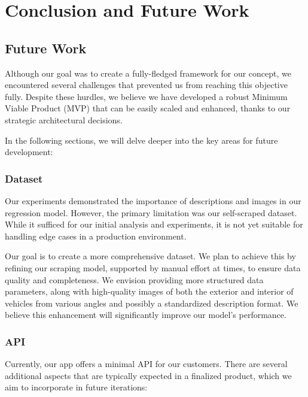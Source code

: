 \chapter{Conclusion and Future Work}

\section{Future Work}

Although our goal was to create a fully-fledged framework for our concept, we encountered several challenges that prevented us from reaching this objective fully. Despite these hurdles, we believe we have developed a robust Minimum Viable Product (MVP) that can be easily scaled and enhanced, thanks to our strategic architectural decisions.

In the following sections, we will delve deeper into the key areas for future development:

\subsection{Dataset}

Our experiments demonstrated the importance of descriptions and images in our regression model. However, the primary limitation was our self-scraped dataset. While it sufficed for our initial analysis and experiments, it is not yet suitable for handling edge cases in a production environment.

Our goal is to create a more comprehensive dataset. We plan to achieve this by refining our scraping model, supported by manual effort at times, to ensure data quality and completeness. We envision providing more structured data parameters, along with high-quality images of both the exterior and interior of vehicles from various angles and possibly a standardized description format. We believe this enhancement will significantly improve our model's performance.


\subsection{API}

Currently, our app offers a minimal API for our customers. There are several additional aspects that are typically expected in a finalized product, which we aim to incorporate in future iterations:

